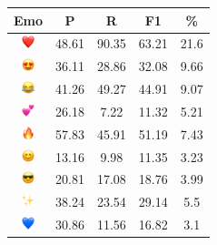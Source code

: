 \documentclass{article}
\begin{document}
\begin{table}
\centering
\begin{tabular}{|c|ccc|c|} \hline
\textbf{Emo} & \textbf{P} & \textbf{R} & \textbf{F1} & \textbf{\%} \\ \hline
\includegraphics[height=0.37cm,width=0.37cm]{img/red_heart.png} & 48.61 & 90.35 & 63.21 & 21.6\\ 
\includegraphics[height=0.37cm,width=0.37cm]{img/smiling_face_with_hearteyes.png} & 36.11 & 28.86 & 32.08 & 9.66\\ 
\includegraphics[height=0.37cm,width=0.37cm]{img/face_with_tears_of_joy.png} & 41.26 & 49.27 & 44.91 & 9.07\\ 
\includegraphics[height=0.37cm,width=0.37cm]{img/two_hearts.png} & 26.18 & 7.22 & 11.32 & 5.21\\ 
\includegraphics[height=0.37cm,width=0.37cm]{img/fire.png} & 57.83 & 45.91 & 51.19 & 7.43\\ 
\includegraphics[height=0.37cm,width=0.37cm]{img/smiling_face_with_smiling_eyes.png} & 13.16 & 9.98 & 11.35 & 3.23\\ 
\includegraphics[height=0.37cm,width=0.37cm]{img/smiling_face_with_sunglasses.png} & 20.81 & 17.08 & 18.76 & 3.99\\ 
\includegraphics[height=0.37cm,width=0.37cm]{img/sparkles.png} & 38.24 & 23.54 & 29.14 & 5.5\\ 
\includegraphics[height=0.37cm,width=0.37cm]{img/blue_heart.png} & 30.86 & 11.56 & 16.82 & 3.1\\ 

\end{tabular}
\end{table}
\end{document}
